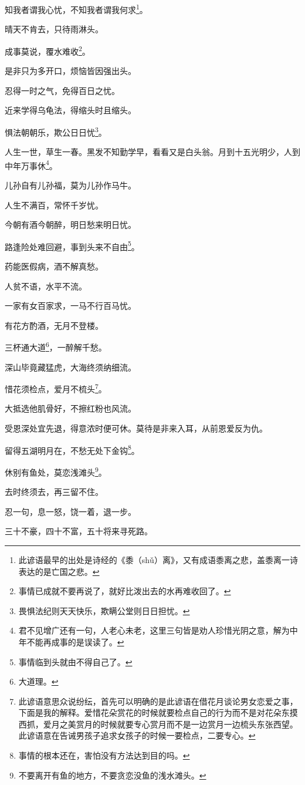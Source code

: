 \documentclass[12pt,oneside]{book}
\begin{document}
知我者谓我心忧，不知我者谓我何求\footnote{此谚语最早的出处是诗经的《黍（shǔ）离》，又有成语黍离之悲，盖黍离一诗表达的是亡国之悲。}。

晴天不肯去，只待雨淋头。

成事莫说，覆水难收\footnote{事情已成就不要再说了，就好比泼出去的水再难收回了。}。

是非只为多开口，烦恼皆因强出头。

忍得一时之气，免得百日之忧。

近来学得乌龟法，得缩头时且缩头。

惧法朝朝乐，欺公日日忧\footnote{畏惧法纪则天天快乐，欺瞒公堂则日日担忧。}。

人生一世，草生一春。黑发不知勤学早，看看又是白头翁。月到十五光明少，人到中年万事休\footnote{君不见增广还有一句，人老心未老，这里三句皆是劝人珍惜光阴之意，解为中年不能再成事的是误读了。}。

儿孙自有儿孙福，莫为儿孙作马牛。

人生不满百，常怀千岁忧。

今朝有酒今朝醉，明日愁来明日忧。

路逢险处难回避，事到头来不自由\footnote{事情临到头就由不得自己了。}。

药能医假病，酒不解真愁。

人贫不语，水平不流。

一家有女百家求，一马不行百马忧。

有花方酌酒，无月不登楼。

三杯通大道\footnote{大道理。}，一醉解千愁。

深山毕竟藏猛虎，大海终须纳细流。

惜花须检点，爱月不梳头\footnote{此谚语意思众说纷纭，首先可以明确的是此谚语在借花月谈论男女恋爱之事，下面是我的解释。爱惜花朵赏花的时候就要检点自己的行为而不是对花朵东摸西抓，爱月之美赏月的时候就要专心赏月而不是一边赏月一边梳头东张西望。此谚语意在告诫男孩子追求女孩子的时候一要检点，二要专心。}。

大抵选他肌骨好，不擦红粉也风流。

受恩深处宜先退，得意浓时便可休。莫待是非来入耳，从前恩爱反为仇。

留得五湖明月在，不愁无处下金钩\footnote{事情的根本还在，害怕没有方法达到目的吗。}。

休别有鱼处，莫恋浅滩头\footnote{不要离开有鱼的地方，不要贪恋没鱼的浅水滩头。}。

去时终须去，再三留不住。

忍一句，息一怒，饶一着，退一步。

三十不豪，四十不富，五十将来寻死路。
\end{document}
